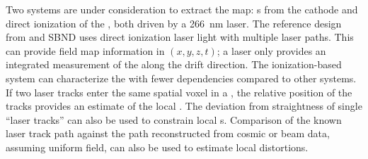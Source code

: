 
Two systems are under consideration to extract the \efield map: \phel{}s from the \lartpc cathode and direct ionization of the , both driven by a \SI{266}{\nano\m} laser.  The reference design from  and SBND uses direct ionization laser light with multiple laser paths. This can provide field map information in $(x, y, z, t)$; a \phel laser only provides an integrated measurement of the \efield along the drift direction.
The ionization-based system can characterize the \efield with fewer dependencies compared to other systems. If two laser tracks enter the same spatial voxel  
in a , the relative position of the tracks provides an estimate of the local \threed \efield. The deviation from straightness of single ``laser tracks'' can also be used to constrain local \efield{}s. Comparison of the known laser track path against the path reconstructed from cosmic or beam data, assuming uniform field, can also be used to estimate local \efield distortions. 



